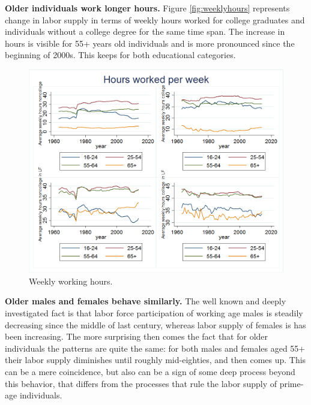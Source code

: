 \documentclass[
10pt, %
a4paper, %
oneside, %
headinclude,footinclude, %
BCOR5mm, %
]{scrartcl}
\begin{document}
\textbf{Older individuals work longer hours.} Figure \vref{fig:weeklyhours} represents change in labor supply in terms of weekly hours worked for college graduates and individuals without a college degree for the same time span. The increase in hours is visible for 55+ years old individuals and is more pronounced since the beginning of 2000s. This keeps for both educational categories.
\begin{figure}[h]
\centering 
\includegraphics[width=1.0\columnwidth]{old_hours_supply.png} 
\caption{Weekly working hours.} %
\label{fig:weeklyhours} 
\end{figure}

\textbf{Older males and females behave similarly.} The well known and deeply investigated fact is that labor force participation of working age males is steadily decreasing since the middle of last century, whereas labor supply of females is has been increasing. The more surprising then comes the fact that for older individuals the patterns are quite the same: for both males and females aged 55+ their labor supply diminishes until roughly mid-eighties, and then comes up. This can be a mere coincidence, but also can be a sign of some deep process beyond this behavior, that differs from the processes that rule the labor supply of prime-age individuals.
\end{document}
